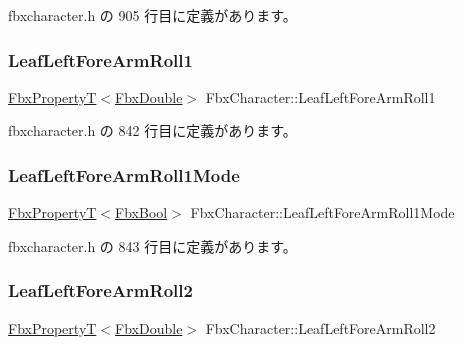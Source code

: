  fbxcharacter.\+h の 905 行目に定義があります。

\mbox{\label{class_fbx_character_a667959babe164a1a1caed384f4060480}} 
\subsubsection{\texorpdfstring{Leaf\+Left\+Fore\+Arm\+Roll1}{LeafLeftForeArmRoll1}}
{\footnotesize\ttfamily \hyperlink{class_fbx_property_t}{Fbx\+PropertyT}$<$\hyperlink{fbxtypes_8h_a171e72a1c46fc15c1a6c9c31948c1c5b}{Fbx\+Double}$>$ Fbx\+Character\+::\+Leaf\+Left\+Fore\+Arm\+Roll1}



 fbxcharacter.\+h の 842 行目に定義があります。

\mbox{\label{class_fbx_character_a2ecfa46345f8c11460d243efbbd81dbc}} 
\subsubsection{\texorpdfstring{Leaf\+Left\+Fore\+Arm\+Roll1\+Mode}{LeafLeftForeArmRoll1Mode}}
{\footnotesize\ttfamily \hyperlink{class_fbx_property_t}{Fbx\+PropertyT}$<$\hyperlink{fbxtypes_8h_a92e0562b2fe33e76a242f498b362262e}{Fbx\+Bool}$>$ Fbx\+Character\+::\+Leaf\+Left\+Fore\+Arm\+Roll1\+Mode}



 fbxcharacter.\+h の 843 行目に定義があります。

\mbox{\label{class_fbx_character_aca4aad2d5dc46cb61dd8ad54aeef10ff}} 
\subsubsection{\texorpdfstring{Leaf\+Left\+Fore\+Arm\+Roll2}{LeafLeftForeArmRoll2}}
{\footnotesize\ttfamily \hyperlink{class_fbx_property_t}{Fbx\+PropertyT}$<$\hyperlink{fbxtypes_8h_a171e72a1c46fc15c1a6c9c31948c1c5b}{Fbx\+Double}$>$ Fbx\+Character\+::\+Leaf\+Left\+Fore\+Arm\+Roll2}



